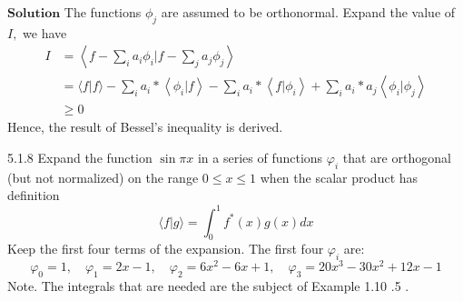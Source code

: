 $\boxed{\textbf{Solution}}$ The functions $\phi_{j}$ are assumed to be orthonormal.
Expand the value of $I,$ we have
$$\begin{aligned} I &=\left\langle f-\sum_{i} a_{i} \phi_{i} | f-\sum_{j} a_{j} \phi_{j}\right\rangle \\ &=\langle f | f\rangle-\sum_{i} a_{i} *\left\langle\phi_{i} | f\right\rangle-\sum_{i} a_{i} *\left\langle f | \phi_{i}\right\rangle+\sum_{i} a_{i} * a_{j}\left\langle\phi_{i} | \phi_{j}\right\rangle \\ & \geq 0 \end{aligned}$$
Hence, the result of Bessel's inequality is derived.

\newpage

\begin{mybox}{5.1.8}
Expand the function $\sin \pi x$ in a series of functions $\varphi_{i}$ that are orthogonal (but not normalized) on the range $0 \leq x \leq 1$ when the scalar product has definition
$$
\langle f | g\rangle=\int_{0}^{1} f^{*}(x) g(x) d x
$$
Keep the first four terms of the expansion. The first four $\varphi_{i}$ are:
$$
\varphi_{0}=1, \quad \varphi_{1}=2 x-1, \quad \varphi_{2}=6 x^{2}-6 x+1, \quad \varphi_{3}=20 x^{3}-30 x^{2}+12 x-1
$$
Note. The integrals that are needed are the subject of Example 1.10 .5 .
\end{mybox}

